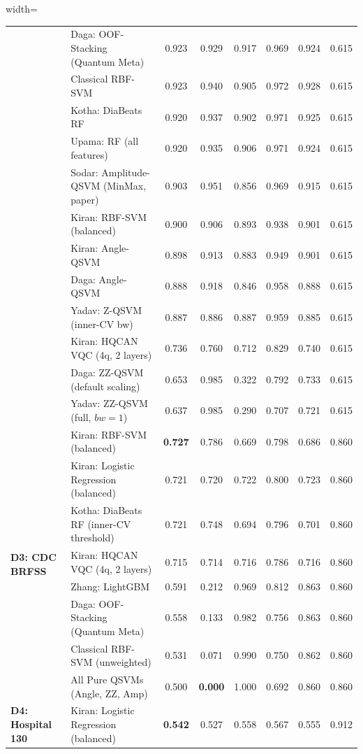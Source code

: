 \documentclass[journal,twocolumn]{IEEEtran}
\begin{document}
\begin{table}[htbp]
\begin{adjustbox}{width=\textwidth}
\begin{tabular}{llcccccc}
& Daga: OOF-Stacking (Quantum Meta) & 0.923 & 0.929 & 0.917 & 0.969 & 0.924 & 0.615 \\
& Classical RBF-SVM & 0.923 & 0.940 & 0.905 & 0.972 & 0.928 & 0.615 \\
& Kotha: DiaBeats RF & 0.920 & 0.937 & 0.902 & 0.971 & 0.925 & 0.615 \\
& Upama: RF (all features) & 0.920 & 0.935 & 0.906 & 0.971 & 0.924 & 0.615 \\
& Sodar: Amplitude-QSVM (MinMax, paper) & 0.903 & 0.951 & 0.856 & 0.969 & 0.915 & 0.615 \\
& Kiran: RBF-SVM (balanced) & 0.900 & 0.906 & 0.893 & 0.938 & 0.901 & 0.615 \\
& Kiran: Angle-QSVM & 0.898 & 0.913 & 0.883 & 0.949 & 0.901 & 0.615 \\
& Daga: Angle-QSVM & 0.888 & 0.918 & 0.846 & 0.958 & 0.888 & 0.615 \\
& Yadav: Z-QSVM (inner-CV bw) & 0.887 & 0.886 & 0.887 & 0.959 & 0.885 & 0.615 \\
& Kiran: HQCAN VQC (4q, 2 layers) & 0.736 & 0.760 & 0.712 & 0.829 & 0.740 & 0.615 \\
& Daga: ZZ-QSVM (default scaling) & 0.653 & 0.985 & 0.322 & 0.792 & 0.733 & 0.615 \\
& Yadav: ZZ-QSVM (full, $bw=1$) & 0.637 & 0.985 & 0.290 & 0.707 & 0.721 & 0.615 \\
\midrule
\multirow{8}{*}{\textbf{D3: CDC BRFSS}} 
& Kiran: RBF-SVM (balanced) & \textbf{0.727} & 0.786 & 0.669 & 0.798 & 0.686 & 0.860 \\
& Kiran: Logistic Regression (balanced) & 0.721 & 0.720 & 0.722 & 0.800 & 0.723 & 0.860 \\
& Kotha: DiaBeats RF (inner-CV threshold) & 0.721 & 0.748 & 0.694 & 0.796 & 0.701 & 0.860 \\
& Kiran: HQCAN VQC (4q, 2 layers) & 0.715 & 0.714 & 0.716 & 0.786 & 0.716 & 0.860 \\
& Zhang: LightGBM & 0.591 & 0.212 & 0.969 & 0.812 & 0.863 & 0.860 \\
& Daga: OOF-Stacking (Quantum Meta) & 0.558 & 0.133 & 0.982 & 0.756 & 0.863 & 0.860 \\
& Classical RBF-SVM (unweighted) & 0.531 & 0.071 & 0.990 & 0.750 & 0.862 & 0.860 \\
& All Pure QSVMs (Angle, ZZ, Amp) & 0.500 & \textbf{0.000} & 1.000 & 0.692 & 0.860 & 0.860 \\
\midrule
\multirow{7}{*}{\textbf{D4: Hospital 130}} 
& Kiran: Logistic Regression (balanced) & \textbf{0.542} & 0.527 & 0.558 & 0.567 & 0.555 & 0.912 \\

\end{tabular}
\end{adjustbox}
\end{table}
\end{document}
